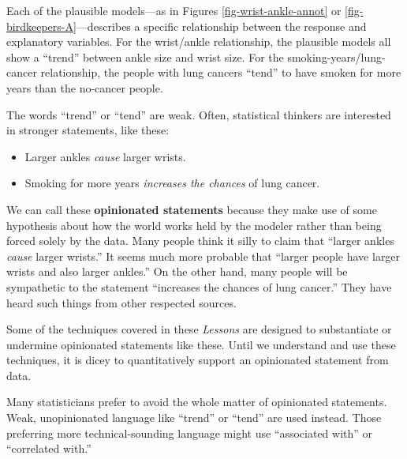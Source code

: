 \documentclass[
  letterpaper,
  DIV=11,
  numbers=noendperiod,
  oneside]{scrartcl}
\providecommand{\tightlist}{%
  \setlength{\itemsep}{0pt}\setlength{\parskip}{0pt}}\usepackage{longtable,booktabs,array}
\begin{document}
\begin{tcolorbox}[enhanced jigsaw, colbacktitle=quarto-callout-note-color!10!white, opacityback=0, breakable, opacitybacktitle=0.6, colback=white, coltitle=black, arc=.35mm, title=\textcolor{quarto-callout-note-color}{\faInfo}\hspace{0.5em}{``Trend'' or ``cause''}, left=2mm, colframe=quarto-callout-note-color-frame, rightrule=.15mm, bottomrule=.15mm, leftrule=.75mm, bottomtitle=1mm, toptitle=1mm, titlerule=0mm, toprule=.15mm]

Each of the plausible models---as in Figures \ref{fig-wrist-ankle-annot}
or \ref{fig-birdkeepers-A}---describes a specific relationship between
the response and explanatory variables. For the wrist/ankle
relationship, the plausible models all show a ``trend'' between ankle
size and wrist size. For the smoking-years/lung-cancer relationship, the
people with lung cancers ``tend'' to have smoken for more years than the
no-cancer people.

The words ``trend'' or ``tend'' are weak. Often, statistical thinkers
are interested in stronger statements, like these:

\begin{itemize}
\tightlist
\item
  Larger ankles \emph{cause} larger wrists.
\item
  Smoking for more years \emph{increases the chances} of lung cancer.
\end{itemize}

We can call these \textbf{opinionated statements} because they make use
of some hypothesis about how the world works held by the modeler rather
than being forced solely by the data. Many people think it silly to
claim that ``larger ankles \emph{cause} larger wrists.'' It seems much
more probable that ``larger people have larger wrists and also larger
ankles.'' On the other hand, many people will be sympathetic to the
statement ``increases the chances of lung cancer.'' They have heard such
things from other respected sources.

Some of the techniques covered in these \emph{Lessons} are designed to
substantiate or undermine opinionated statements like these. Until we
understand and use these techniques, it is dicey to quantitatively
support an opinionated statement from data.

Many statisticians prefer to avoid the whole matter of opinionated
statements. {} Weak, unopinionated
language like ``trend'' or ``tend'' are used instead. Those preferring
more technical-sounding language might use ``associated with'' or
``correlated with.''

\end{tcolorbox}
\end{document}
